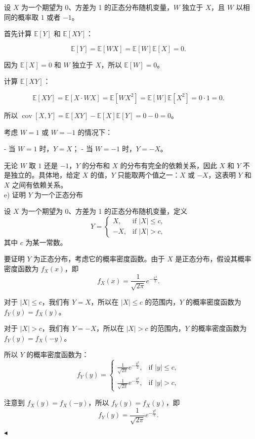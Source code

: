 \documentclass[11pt]{article}
\newenvironment{question}[2][Question]{\begin{trivlist}
\item[\hskip \labelsep {\bfseries #1}\hskip \labelsep {\bfseries #2.}]}{\hfill$\blacktriangleleft$\end{trivlist}}
\newcommand\E{\mathbb{E}}
\newcommand{\cov}{\operatorname{cov}}
\begin{document}
\begin{question}{2 (30') (独立性)}
设 \(X\) 为一个期望为 0、方差为 1 的正态分布随机变量，\(W\) 独立于 \(X\)，且 \(W\) 以相同的概率取 \(1\) 或者 \(-1\)。

首先计算 \(\E[Y]\) 和 \(\E[XY]\)：

\[ \E[Y] = \E[WX] = \E[W]\E[X] = 0. \]

因为 \(\E[X] = 0\) 和 \(W\) 独立于 \(X\)，所以 \( \E[W] = 0 \)。

计算 \(\E[XY]\)：

\[ \E[XY] = \E[X \cdot WX] = \E[W X^2] = \E[W] \E[X^2] = 0 \cdot 1 = 0. \]

所以 \( \cov[X, Y] = \E[XY] - \E[X]\E[Y] = 0 - 0 = 0 \)。

考虑 \(W = 1\) 或 \(W = -1\) 的情况下：

- 当 \(W = 1\) 时，\(Y = X\)；
- 当 \(W = -1\) 时，\(Y = -X\)。

无论 \(W\) 取 \(1\) 还是 \(-1\)，\(Y\) 的分布和 \(X\) 的分布有完全的依赖关系，因此 \(X\) 和 \(Y\) 不是独立的。具体地，给定 \(X\) 的值，\(Y\) 只能取两个值之一：\(X\) 或 \(-X\)，这表明 \(Y\) 和 \(X\) 之间有依赖关系。\\


e) 证明 \(Y\) 为一个正态分布

设 \(X\) 为一个期望为 0、方差为 1 的正态分布随机变量，定义
\[ Y = \begin{cases} 
X, & \text{if } |X| \leq c, \\
-X, & \text{if } |X| > c,
\end{cases} \]
其中 \(c\) 为某一常数。


要证明 \(Y\) 为正态分布，考虑它的概率密度函数。由于 \(X\) 是正态分布，假设其概率密度函数为 \(f_X(x)\)，即
\[ f_X(x) = \frac{1}{\sqrt{2\pi}} e^{-\frac{x^2}{2}}. \]

对于 \(|X| \leq c\)，我们有 \(Y = X\)，所以在 \(|X| \leq c\) 的范围内，\(Y\) 的概率密度函数为 \(f_Y(y) = f_X(y)\)。

对于 \(|X| > c\)，我们有 \(Y = -X\)，所以在 \(|X| > c\) 的范围内，\(Y\) 的概率密度函数为 \(f_Y(y) = f_X(-y)\)。

所以 \(Y\) 的概率密度函数为：
\[ f_Y(y) = \begin{cases} 
\frac{1}{\sqrt{2\pi}} e^{-\frac{y^2}{2}}, & \text{if } |y| \leq c, \\
\frac{1}{\sqrt{2\pi}} e^{-\frac{y^2}{2}}, & \text{if } |y| > c,
\end{cases} \]

注意到 \(f_X(y) = f_X(-y)\)，所以 \(f_Y(y) = f_X(y)\)，即
\[ f_Y(y) = \frac{1}{\sqrt{2\pi}} e^{-\frac{y^2}{2}}. \]


\end{question}
\end{document}
